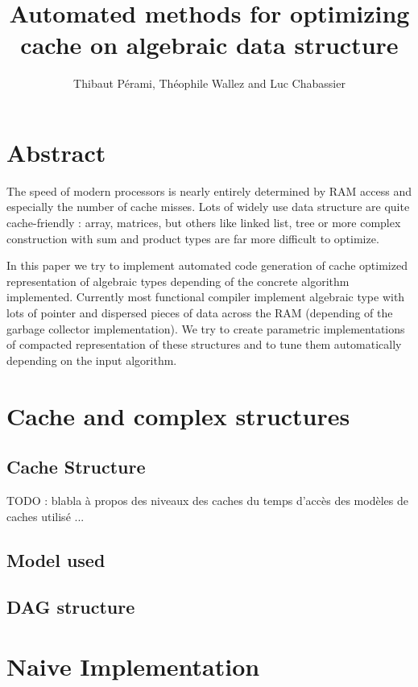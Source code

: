 \documentclass[12pt]{article}
\title{Automated methods for optimizing cache on algebraic data structure}
\author{Thibaut Pérami, Théophile Wallez and Luc Chabassier}
\begin{document}
\maketitle


\section{Abstract}

The speed of modern processors is nearly entirely determined by RAM access and
especially the number of cache misses. Lots of widely use data structure are
quite cache-friendly : array, matrices, but others like linked list, tree or
more complex construction with sum and product types are far more difficult to
optimize.

In this paper we try to implement automated code generation of cache optimized
representation of algebraic types depending of the concrete algorithm
implemented. Currently most functional compiler implement algebraic type with
lots of pointer and dispersed pieces of data across the RAM (depending of the
garbage collector implementation). We try to create parametric implementations
of compacted representation of these structures and to tune them automatically
depending on the input algorithm.

\section{Cache and complex structures}

\subsection{Cache Structure}

TODO : blabla à propos des niveaux des caches du temps d'accès des modèles de
caches utilisé ...

\subsection{Model used}

\subsection{DAG structure}

\section{Naive Implementation}
\end{document}
